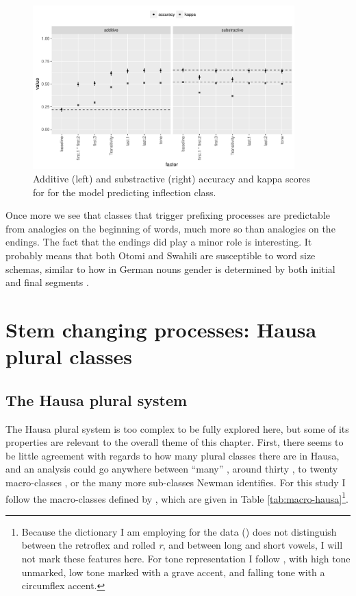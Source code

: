 \begin{figure}[!htpb]
  \centering
  \includegraphics[width=0.9\textwidth]{./figures/otomi/fact-imp.pdf}
  \caption{Additive (left) and substractive (right) accuracy and kappa scores for for the model predicting inflection class.}\label{fig:fact-imp-otomi}
\end{figure}

Once more we see that classes that trigger prefixing processes are predictable from analogies on the beginning of words, much more so than analogies on the endings. The fact that the endings did play a minor role is interesting. It probably means that both Otomi and Swahili are susceptible to word size schemas, similar to how in German nouns gender is determined by both initial and final segments \autocite{Kopcke.1984}.%


\section{Stem changing processes: Hausa plural classes}


\subsection{The Hausa plural system}

The Hausa plural system is too complex to be fully explored here, but some of its properties are relevant to the overall theme of this chapter. First, there seems to be little agreement with regards to how many plural classes there are in Hausa, and an analysis could go anywhere between ``many'' \autocite{Migeod.1914}, around thirty \autocite{Schon.1862}, to twenty macro-classes \autocite{Newman.2000}, or the many more sub-classes Newman identifies. For this study I follow the macro-classes defined by \textcite{Newman.2000}, which are given in Table \ref{tab:macro-hausa}\footnote{Because the dictionary I am employing for the data (\textcite{Bargery.1951}) does not distinguish between the retroflex and rolled \textit{r}, and between long and short vowels, I will not mark these features here. For tone representation I follow \textcite{Newman.2000}, with high tone unmarked, low tone marked with a grave accent, and falling tone with a circumflex accent.}.

